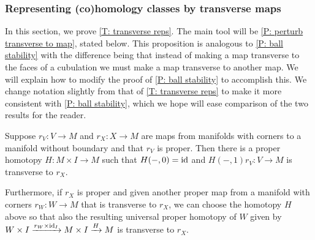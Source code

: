 \subsubsection{Representing (co)homology classes by transverse maps}\label{S: transverse maps}

In this section, we prove \cref{T: transverse reps}.
The main tool will be \cref{P: perturb transverse to map}, stated below.
This proposition is analogous to \cref{P: ball stability} with the difference being that instead of making a map transverse to the faces of a cubulation we must make a map transverse to another map.
We will explain how to modify the proof of \cref{P: ball stability} to accomplish this.
We change notation slightly from that of \cref{T: transverse reps} to make it more consistent with \cref{P: ball stability}, which we hope will ease comparison of the two results for the reader.

\begin{proposition}\label{P: perturb transverse to map}
	Suppose $r_V \colon V \to M$ and $r_X \colon X \to M$ are maps from manifolds with corners to a manifold without boundary and that $r_V$ is proper.
	Then there is a proper homotopy $H \colon M \times I \to M$ such that $H(-,0) = \mathrm{id}$ and $H(-,1)r_V \colon V \to M$ is transverse to $r_X$.

	Furthermore, if $r_X$ is proper and given another proper map from a manifold with corners $r_W \colon W \to M$ that is transverse to $r_X$, we can choose the homotopy $H$ above so that also the resulting universal proper homotopy of $W$ given by $W \times I \xrightarrow{r_W \times \mathrm{id}_I} M \times I \xrightarrow{H} M$ is transverse to $r_X$.
\end{proposition}

